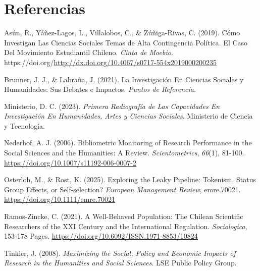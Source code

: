 \documentclass[
  spanish,
  a4paper,
  oneside]{scrbook}
\newlength{\cslhangindent}
\newenvironment{CSLReferences}[2] %
 {\begin{list}{}{%
  \setlength{\itemindent}{0pt}
  \setlength{\leftmargin}{0pt}
  \setlength{\parsep}{0pt}
  \ifodd #1
   \setlength{\leftmargin}{\cslhangindent}
   \setlength{\itemindent}{-1\cslhangindent}
  \fi
  \setlength{\itemsep}{#2\baselineskip}}}
 {\end{list}}
\begin{document}
\chapter{Referencias}\label{referencias}

\label{refs}
\begin{CSLReferences}{1}{0}
Asún, R., Yáñez-Lagos, L., Villalobos, C., \& Zúñiga-Rivas, C. (2019).
Cómo Investigan Las Ciencias Sociales Temas de Alta Contingencia
Política. {El} Caso Del Movimiento Estudiantil Chileno. \emph{Cinta de
Moebio}.
https://doi.org/\url{http://dx.doi.org/10.4067/s0717-554x2019000200235}

Brunner, J. J., \& Labraña, J. (2021). La {Investigación} En {Ciencias
Sociales} y {Humanidades}: {Sus} Debates e Impactos. \emph{Puntos de
Referencia}.

Ministerio, D. C. (2023). \emph{Primera {Radiografía} de Las Capacidades
En Investigación En {Humanidades}, {Artes} y {Ciencias Sociales}}.
Ministerio de Ciencia y Tecnología.

Nederhof, A. J. (2006). Bibliometric Monitoring of Research Performance
in the {Social Sciences} and the {Humanities}: {A Review}.
\emph{Scientometrics}, \emph{66}(1), 81-100.
\url{https://doi.org/10.1007/s11192-006-0007-2}

Osterloh, M., \& Rost, K. (2025). Exploring the Leaky Pipeline:
{Tokenism}, Status Group Effects, or Self-selection? \emph{European
Management Review}, emre.70021. \url{https://doi.org/10.1111/emre.70021}

Ramos-Zincke, C. (2021). A {Well-Behaved Population}: {The Chilean
Scientific Researchers} of the {XXI Century} and the {International
Regulation}. \emph{Sociologica}, 153-178 Pages.
\url{https://doi.org/10.6092/ISSN.1971-8853/10824}

Tinkler, J. (2008). \emph{Maximizing the Social, Policy and Economic
Impacts of Research in the Humanities and Social Sciences}. LSE Public
Policy Group.

\end{CSLReferences}


\backmatter

\mainmatter
\pagestyle{scrheadings}

\end{document}
